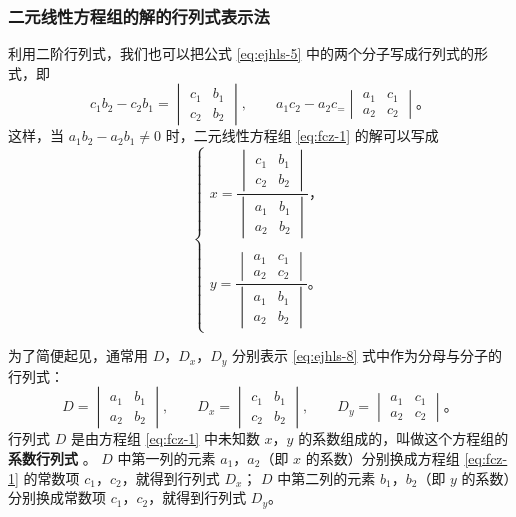 \subsubsection{二元线性方程组的解的行列式表示法}

利用二阶行列式，我们也可以把公式 \eqref{eq:ejhls-5} 中的两个分子写成行列式的形式，即
$$
c_1b_2 - c_2b_1 = \begin{vmatrix}
    c_1 & b_1 \\
    c_2 & b_2
\end{vmatrix}, \qquad
a_1c_2 - a_2c_ = \begin{vmatrix}
    a_1 & c_1 \\
    a_2 & c_2
\end{vmatrix} \text{。}
$$
这样，当 $a_1b_2 - a_2b_1 \neq 0$ 时，二元线性方程组 \eqref{eq:fcz-1} 的解可以写成
\begin{equation}
    \begin{cases}
        x = \dfrac{
                \begin{vmatrix}
                    c_1 & b_1 \\
                    c_2 & b_2
                \end{vmatrix}
            }{
                \begin{vmatrix}
                    a_1 & b_1 \\
                    a_2 & b_2
                \end{vmatrix}
            } \text{，} \\
        \\
        y = \dfrac{
                \begin{vmatrix}
                    a_1 & c_1 \\
                    a_2 & c_2
                \end{vmatrix}
            }{
                \begin{vmatrix}
                    a_1 & b_1 \\
                    a_2 & b_2
                \end{vmatrix}
            } \text{。}
    \end{cases} \label{eq:ejhls-8}
\end{equation}

为了简便起见，通常用 $D$，$D_x$，$D_y$ 分别表示 \eqref{eq:ejhls-8} 式中作为分母与分子的行列式：
$$
D = \begin{vmatrix}
    a_1 & b_1 \\
    a_2 & b_2
\end{vmatrix}, \qquad
D_x = \begin{vmatrix}
    c_1 & b_1 \\
    c_2 & b_2
\end{vmatrix}, \qquad
D_y = \begin{vmatrix}
    a_1 & c_1 \\
    a_2 & c_2
\end{vmatrix} \text{。}
$$
行列式 $D$ 是由方程组 \eqref{eq:fcz-1} 中未知数 $x$，$y$ 的系数组成的，叫做这个方程组的\textbf{系数行列式} 。
$D$ 中第一列的元素 $a_1$，$a_2$（即 $x$ 的系数）分别换成方程组 \eqref{eq:fcz-1} 的常数项 $c_1$，$c_2$，就得到行列式 $D_x$；
$D$ 中第二列的元素 $b_1$，$b_2$（即 $y$ 的系数）分别换成常数项 $c_1$，$c_2$，就得到行列式 $D_y$。

